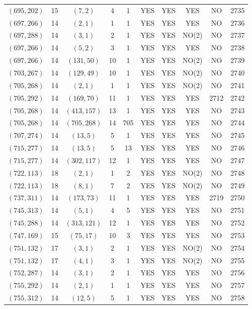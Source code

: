 \begin{longtable}{|c|c|c|c|c|c|c|c|c|c|}
$(695, 202)$ & 15 & $(7, 2)$ & 4 & 1 & YES & YES & YES & NO & 2735\\
$(697, 266)$ & 14 & $(2, 1)$ & 1 & 1 & YES & YES & YES & NO & 2736\\
$(697, 288)$ & 14 & $(3, 1)$ & 2 & 1 & YES & YES & NO(2) & NO & 2737\\
$(697, 266)$ & 14 & $(5, 2)$ & 3 & 1 & YES & YES & YES & NO & 2738\\
$(697, 266)$ & 14 & $(131, 50)$ & 10 & 1 & YES & YES & NO(2) & NO & 2739\\
$(703, 267)$ & 14 & $(129, 49)$ & 10 & 1 & YES & YES & NO(2) & NO & 2740\\
$(705, 268)$ & 14 & $(2, 1)$ & 1 & 1 & YES & YES & NO(2) & NO & 2741\\
$(705, 292)$ & 14 & $(169, 70)$ & 11 & 1 & YES & YES & YES & 2712 & 2742\\
$(705, 268)$ & 14 & $(413, 157)$ & 13 & 1 & YES & YES & YES & NO & 2743\\
$(705, 268)$ & 14 & $(705, 268)$ & 14 & 705 & YES & YES & YES & NO & 2744\\
$(707, 274)$ & 14 & $(13, 5)$ & 5 & 1 & YES & YES & YES & NO & 2745\\
$(715, 277)$ & 14 & $(13, 5)$ & 5 & 13 & YES & YES & YES & NO & 2746\\
$(715, 277)$ & 14 & $(302, 117)$ & 12 & 1 & YES & YES & YES & NO & 2747\\
$(722, 113)$ & 18 & $(2, 1)$ & 1 & 2 & YES & YES & NO(2) & NO & 2748\\
$(722, 113)$ & 18 & $(8, 1)$ & 7 & 2 & YES & YES & NO(2) & NO & 2749\\
$(737, 311)$ & 14 & $(173, 73)$ & 11 & 1 & YES & YES & YES & 2719 & 2750\\
$(745, 313)$ & 14 & $(5, 1)$ & 4 & 5 & YES & YES & YES & NO & 2751\\
$(745, 288)$ & 14 & $(313, 121)$ & 12 & 1 & YES & YES & YES & NO & 2752\\
$(747, 169)$ & 15 & $(75, 17)$ & 10 & 3 & YES & YES & YES & NO & 2753\\
$(751, 132)$ & 17 & $(3, 1)$ & 2 & 1 & YES & YES & NO(2) & NO & 2754\\
$(751, 132)$ & 17 & $(4, 1)$ & 3 & 1 & YES & YES & NO(2) & NO & 2755\\
$(752, 287)$ & 14 & $(3, 1)$ & 2 & 1 & YES & YES & YES & NO & 2756\\
$(755, 292)$ & 14 & $(2, 1)$ & 1 & 1 & YES & YES & YES & NO & 2757\\
$(755, 312)$ & 14 & $(12, 5)$ & 5 & 1 & YES & YES & YES & NO & 2758\\

\end{longtable}
